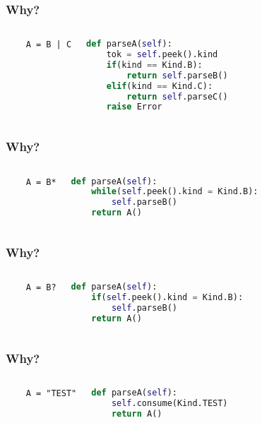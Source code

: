 \documentclass{beamer}
\begin{document}
    \begin{frame}[fragile]
    \frametitle{Why?}
    \begin{columns}
    \begin{verbatim}
    A = B | C
    \end{verbatim}
    \pause
    \begin{lstlisting}[language=Python]
def parseA(self):
    tok = self.peek().kind
    if(kind == Kind.B):
        return self.parseB()
    elif(kind == Kind.C):
        return self.parseC()
    raise Error
        \end{lstlisting}
    \end{columns}
    \end{frame}

    \begin{frame}[fragile]
    \frametitle{Why?}
    \begin{columns}
    \begin{verbatim}
    A = B*
    \end{verbatim}
    \pause
    \begin{lstlisting}[language=Python]
def parseA(self):
    while(self.peek().kind = Kind.B):
        self.parseB()
    return A()
        \end{lstlisting}
    \end{columns}
    \end{frame}

    \begin{frame}[fragile]
    \frametitle{Why?}
    \begin{columns}
    \begin{verbatim}
    A = B?
    \end{verbatim}
    \pause
    \begin{lstlisting}[language=Python]
def parseA(self):
    if(self.peek().kind = Kind.B):
        self.parseB()
    return A()
        \end{lstlisting}
    \end{columns}
    \end{frame}

    \begin{frame}[fragile]
    \frametitle{Why?}
    \begin{columns}
    \begin{verbatim}
    A = "TEST"
    \end{verbatim}
    \pause
    \begin{lstlisting}[language=Python]
def parseA(self):
    self.consume(Kind.TEST)
    return A()
        \end{lstlisting}
    \end{columns}
    \end{frame}
\end{document}
